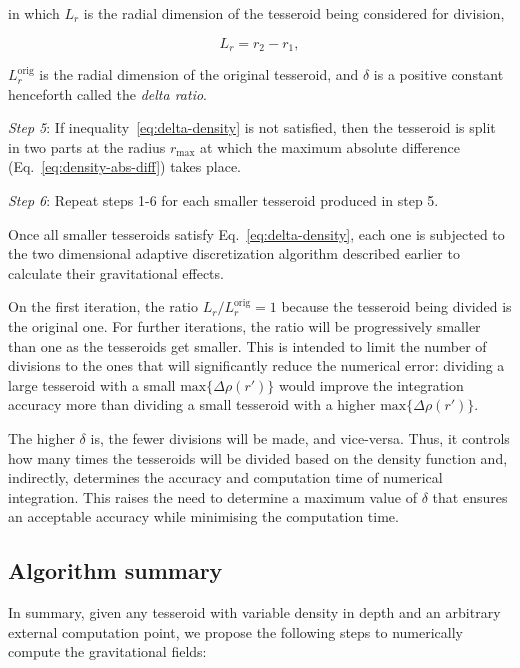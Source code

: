 \documentclass[extra, referee]{gji}
\begin{document}
\noindent
in which $L_r$ is the radial dimension of the tesseroid being considered for division,

\begin{equation}
    L_r = r_2 - r_1,
\end{equation}

\noindent $L_r^\text{orig}$ is the radial dimension of the original tesseroid, and
$\delta$ is a positive constant henceforth called the \textit{delta ratio}.

\textit{Step 5}:
If inequality~\ref{eq:delta-density} is not satisfied, then the tesseroid is split in
two parts at the radius $r_\text{max}$ at which the maximum absolute difference
(Eq.~\ref{eq:density-abs-diff}) takes place.

\textit{Step 6}:
Repeat steps 1-6 for each smaller tesseroid produced in step 5.

Once all smaller tesseroids satisfy Eq.~\ref{eq:delta-density},
each one is subjected to the two dimensional adaptive
discretization algorithm described earlier to calculate their gravitational effects.

On the first iteration, the ratio $L_r/L_r^\text{orig} = 1$ because the tesseroid being
divided is the original one.
For further iterations, the ratio will be progressively smaller than one as the
tesseroids get smaller.
This is intended to limit the number of divisions to the ones that will
significantly reduce the numerical error:
dividing a large tesseroid with a small $\text{max}\{ \Delta \rho(r') \}$ would
improve the integration accuracy more than dividing a small tesseroid with a
higher $\text{max}\{ \Delta \rho(r') \}$.

The higher $\delta$ is, the fewer divisions will be made, and vice-versa.
Thus, it controls how many times the tesseroids will be divided based on the density
function and, indirectly, determines the accuracy and computation time of
numerical integration.
This raises the need to determine a maximum value of $\delta$ that
ensures an acceptable accuracy while minimising the computation time.


\subsection{Algorithm summary}

In summary, given any tesseroid with variable density in depth and an arbitrary
external computation point, we propose the following steps to numerically
compute the gravitational fields:
\end{document}
